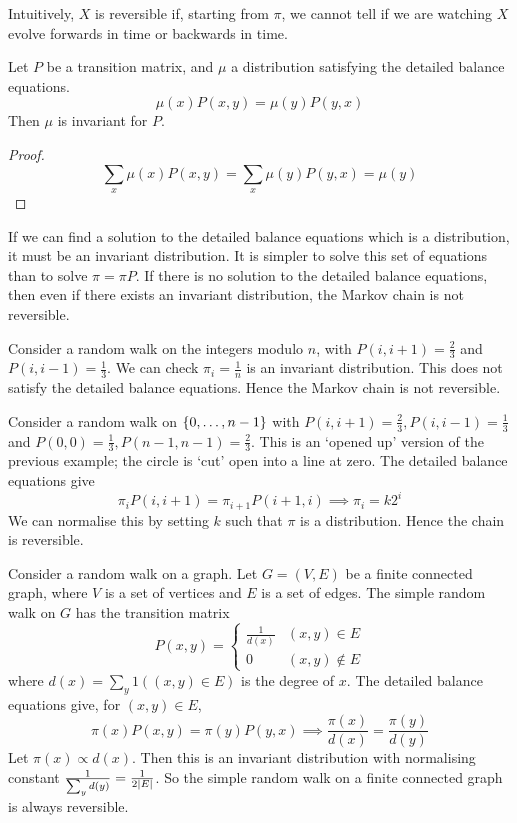 \begin{remark}
	Intuitively, \( X \) is reversible if, starting from \( \pi \), we cannot tell if we are watching \( X \) evolve forwards in time or backwards in time.
\end{remark}
\begin{lemma}
	Let \( P \) be a transition matrix, and \( \mu \) a distribution satisfying the detailed balance equations.
	\[
		\mu(x) P(x,y) = \mu(y) P(y,x)
	\]
	Then \( \mu \) is invariant for \( P \).
\end{lemma}
\begin{proof}
	\[
		\sum_x \mu(x) P(x,y) = \sum_x \mu(y) P(y,x) = \mu(y)
	\]
\end{proof}
\begin{remark}
	If we can find a solution to the detailed balance equations which is a distribution, it must be an invariant distribution.
	It is simpler to solve this set of equations than to solve \( \pi = \pi P \).
	If there is no solution to the detailed balance equations, then even if there exists an invariant distribution, the Markov chain is not reversible.
\end{remark}
\begin{example}
	Consider a random walk on the integers modulo \( n \), with \( P(i, i+1) = \frac{2}{3} \) and \( P(i, i-1) = \frac{1}{3} \).
	We can check \( \pi_i = \frac{1}{n} \) is an invariant distribution.
	This does not satisfy the detailed balance equations.
	Hence the Markov chain is not reversible.
\end{example}
\begin{example}
	Consider a random walk on \( \qty{0, \dots, n-1} \) with \( P(i, i+1) = \frac{2}{3}, P(i, i-1) = \frac{1}{3} \) and \( P(0,0) = \frac{1}{3}, P(n-1, n-1) = \frac{2}{3} \).
	This is an `opened up' version of the previous example; the circle is `cut' open into a line at zero.
	The detailed balance equations give
	\[
		\pi_i P(i, i+1) = \pi_{i+1} P(i+1, i) \implies \pi_i = k 2^i
	\]
	We can normalise this by setting \( k \) such that \( \pi \) is a distribution.
	Hence the chain is reversible.
\end{example}
\begin{example}
	Consider a random walk on a graph.
	Let \( G = (V, E) \) be a finite connected graph, where \( V \) is a set of vertices and \( E \) is a set of edges.
	The simple random walk on \( G \) has the transition matrix
	\[
		P(x,y) = \begin{cases}
			\frac{1}{d(x)} & (x,y) \in E     \\
			0              & (x,y) \not\in E
		\end{cases}
	\]
	where \( d(x) = \sum_y 1((x,y) \in E) \) is the degree of \( x \).
	The detailed balance equations give, for \( (x,y) \in E \),
	\[
		\pi(x) P(x,y) = \pi(y) P(y,x) \implies \frac{\pi(x)}{d(x)} = \frac{\pi(y)}{d(y)}
	\]
	Let \( \pi(x) \propto d(x) \).
	Then this is an invariant distribution with normalising constant \( \frac{1}{\sum_y d(y)} = \frac{1}{2\abs{E}} \).
	So the simple random walk on a finite connected graph is always reversible.
\end{example}

